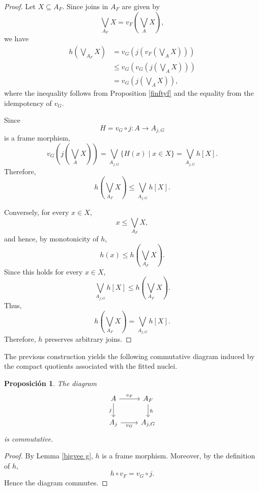 \documentclass[11pt]{amsart}
\theoremstyle{plain}
\newtheorem{prop}[thm]{Proposición}
\theoremstyle{definition}
\begin{document}
\begin{proof}
Let \(X\subseteq A_F\). Since joins in \(A_F\) are given by
\[
    \bigvee_{A_F}X
    =
    v_F\left(\bigvee_A X\right),
\]
we have
\[
\begin{aligned}
    h\left(\bigvee_{A_F}X\right)
    &=
    v_G\left(
        j\left(
            v_F\left(\bigvee_A X\right)
        \right)
    \right)\\
    &\leq
    v_G\left(
        v_G\left(
            j\left(\bigvee_A X\right)
        \right)
    \right)\\
    &=
    v_G\left(
        j\left(\bigvee_A X\right)
    \right),
\end{aligned}
\]
where the inequality follows from Proposition \ref{finftyf} and the equality from
the idempotency of \(v_G\).

Since
\[
    H=v_G\circ j\colon A\longrightarrow A_{j,G}
\]
is a frame morphism,
\[
    v_G\left(j\left(\bigvee_A X\right)\right)
    =
    \bigvee_{A_{j,G}}\{H(x)\mid x\in X\}
    =
    \bigvee_{A_{j,G}}h[X].
\]
Therefore,
\[
    h\left(\bigvee_{A_F}X\right)
    \leq
    \bigvee_{A_{j,G}}h[X].
\]

Conversely, for every \(x\in X\),
\[
    x\leq\bigvee_{A_F}X,
\]
and hence, by monotonicity of \(h\),
\[
    h(x)\leq
    h\left(\bigvee_{A_F}X\right).
\]
Since this holds for every \(x\in X\),
\[
    \bigvee_{A_{j,G}}h[X]
    \leq
    h\left(\bigvee_{A_F}X\right).
\]
Thus,
\[
    h\left(\bigvee_{A_F}X\right)
    =
    \bigvee_{A_{j,G}}h[X].
\]
Therefore, \(h\) preserves arbitrary joins.
\end{proof}

The previous construction yields the following commutative diagram
induced by the compact quotients associated with the fitted nuclei.

\begin{prop}\label{VFsquare}
The diagram
\begin{equation}\label{Cuadrado}
\begin{tikzcd}
    A \arrow[r,"v_F"] \arrow[d,"j"'] &
    A_F \arrow[d,"h"] \\
    A_j \arrow[r,"v_G"'] &
    A_{j,G}
\end{tikzcd}
\end{equation}
is commutative.
\end{prop}

\begin{proof}
By Lemma \ref{bigvee g}, \(h\) is a frame morphism. Moreover, by the definition
of \(h\),
\[
    h\circ v_F=v_G\circ j.
\]
Hence the diagram commutes.
\end{proof}
\end{document}
